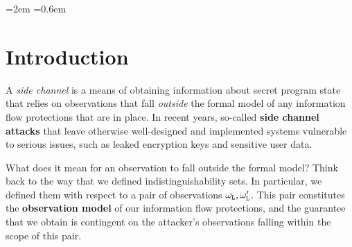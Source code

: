 \documentclass[11pt,twoside]{scrartcl}
\begin{document}
\newcommand{\atrace}{\omega}%
\newcommand{\stdI}{\dTLint[state=\omega]}%
\newcommand{\Ip}{\dTLint[trace=\atrace]}%
\newcommand{\ws}{\omega}\newcommand{\wt}{\nu}%

\newdimen{\linferenceRulehskipamount}
\linferenceRulehskipamount=2em
  \linferenceRulevskipamount=0.6em


\lstset{escapechar=@,style=customc}

\maketitle
\thispagestyle{empty}


\section{Introduction}

A \emph{side channel} is a means of obtaining information about secret program state that relies on observations that fall \emph{outside} the formal model of any information flow protections that are in place. In recent years, so-called \textbf{side channel attacks} that leave otherwise well-designed and implemented systems vulnerable to serious issues, such as leaked encryption keys and sensitive user data.

What does it mean for an observation to fall outside the formal model? Think back to the way that we defined indistinguishability sets. In particular, we defined them with respect to a pair of observations $\omega_{\texttt{\upshape L}}, \omega'_{\texttt{\upshape L}}$. This pair constitutes the \textbf{observation model} of our information flow protections, and the guarantee that we obtain is contingent on the attacker's observations falling within the scope of this pair.
\end{document}
